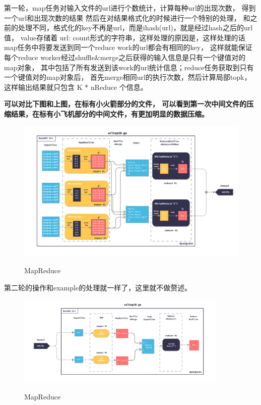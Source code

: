 \documentclass[UTF8]{ctexart}
\begin{document}
第一轮，map任务对输入文件的url进行个数统计，计算每种url的出现次数，
得到一个url和出现次数的结果 然后在对结果格式化的时候进行一个特别的处理，
和之前的处理不同，格式化的key不再是url，而是ihash(url)，就是经过hash之后的url值， 
value存储着 url: count形式的字符串，这样处理的原因是，这样处理的话
map任务中将要发送到同一个reduce work的url都会有相同的key，
这样就能保证每个reduce worker经过shuffle\&merge之后获得的输入信息是只有一个键值对的map对象，
其中包括了所有发送到该work的url统计信息；reduce任务获取到只有一个键值对的map对象后，
首先merge相同url的执行次数，然后计算局部topk，这样输出结果就只包含 K * nReduce 个信息。

\textbf{可以对比下图和上图，在标有小火箭部分的文件，
可以看到第一次中间文件的压缩结果，在标有小飞机部分的中间文件，有更加明显的数据压缩。}
\begin{figure}[H]
  \centering
  \includegraphics[width=1\textwidth]{fig/mr-1.pdf}\\
  \caption{MapReduce}
  \label{mr1}
\end{figure}
第二轮的操作和example的处理就一样了，这里就不做赘述。
\begin{figure}[H]
  \centering
  \includegraphics[width=0.9\textwidth]{fig/mr-2.pdf}\\
  \caption{MapReduce}
  \label{sec2:subsec3:fg1}
\end{figure}
\end{document}
